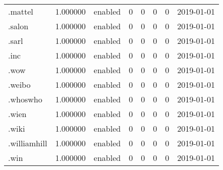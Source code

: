 \begin{tabular}{lrlrrrrl}
.mattel                   &          1.000000 &         enabled &                           0 &                           0 &                           0 &                   0 &           2019-01-01 \\
.salon                    &          1.000000 &         enabled &                           0 &                           0 &                           0 &                   0 &           2019-01-01 \\
.sarl                     &          1.000000 &         enabled &                           0 &                           0 &                           0 &                   0 &           2019-01-01 \\
.inc                      &          1.000000 &         enabled &                           0 &                           0 &                           0 &                   0 &           2019-01-01 \\
.wow                      &          1.000000 &         enabled &                           0 &                           0 &                           0 &                   0 &           2019-01-01 \\
.weibo                    &          1.000000 &         enabled &                           0 &                           0 &                           0 &                   0 &           2019-01-01 \\
.whoswho                  &          1.000000 &         enabled &                           0 &                           0 &                           0 &                   0 &           2019-01-01 \\
.wien                     &          1.000000 &         enabled &                           0 &                           0 &                           0 &                   0 &           2019-01-01 \\
.wiki                     &          1.000000 &         enabled &                           0 &                           0 &                           0 &                   0 &           2019-01-01 \\
.williamhill              &          1.000000 &         enabled &                           0 &                           0 &                           0 &                   0 &           2019-01-01 \\
.win                      &          1.000000 &         enabled &                           0 &                           0 &                           0 &                   0 &           2019-01-01 \\

\end{tabular}
